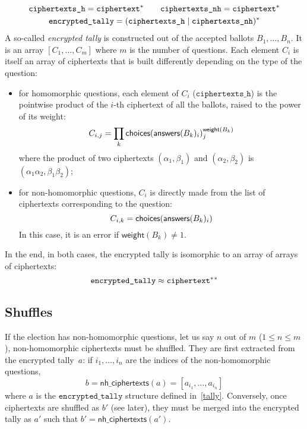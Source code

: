 \documentclass[a4paper]{article}
\newcommand{\etally}{\texttt{encrypted\_tally}}
\begin{document}
\begin{gather*}
  \texttt{ciphertexts\_h}=\ciphertext^\ast
  \qquad
  \texttt{ciphertexts\_nh}=\ciphertext^\ast
  \\
  \etally=(\texttt{ciphertexts\_h}\mid\texttt{ciphertexts\_nh})^\ast
\end{gather*}
A so-called \emph{encrypted tally} is constructed out of the accepted
ballots $B_1,\dots,B_n$.  It is an array $[C_1,\dots,C_m]$ where $m$
is the number of questions. Each element $C_i$ is itself an array of
ciphertexts that is built differently depending on the type of the
question:
\begin{itemize}
\item for homomorphic questions, each element of $C_i$
  ($\texttt{ciphertexts\_h}$) is the pointwise product of the $i$-th
  ciphertext of all the ballots, raised to the power of its weight:
  \[
    C_{i,j}=\prod_{k}\textsf{choices}(\textsf{answers}(B_k)_i)_j^{\textsf{weight}(B_k)}
  \]
  where the product of two ciphertexts $(\alpha_1,\beta_1)$ and
  $(\alpha_2,\beta_2)$ is $(\alpha_1\alpha_2,\beta_1\beta_2)$;
\item for non-homomorphic questions, $C_i$ is directly made from the
  list of ciphertexts corresponding to the question:
  \[
    C_{i,k}=\textsf{choices}(\textsf{answers}(B_k)_i)
  \]
  In this case, it is an error if $\textsf{weight}(B_k)\neq 1$.
\end{itemize}
In the end, in both cases, the encrypted tally is isomorphic to an
array of arrays of ciphertexts:
\[
\etally\approx\ciphertext^\ast{}^\ast
\]

\subsection{Shuffles}
\label{shuffles}

If the election has non-homomorphic questions, let us say $n$ out of
$m$ ($1\leq n\leq m$), non-homomorphic ciphertexts must be
shuffled. They are first extracted from the encrypted tally~$a$: if
$i_1,\dots,i_n$ are the indices of the non-homomorphic questions,
\[
  b=\textsf{nh\_ciphertexts}(a)=[a_{i_1},\dots,a_{i_n}]
\]
where $a$ is the $\etally$ structure defined
in~\ref{tally}. Conversely, once ciphertexts are shuffled as $b'$ (see
later), they must be merged into the encrypted tally as $a'$ such that
$b'=\textsf{nh\_ciphertexts}(a')$.
\end{document}
